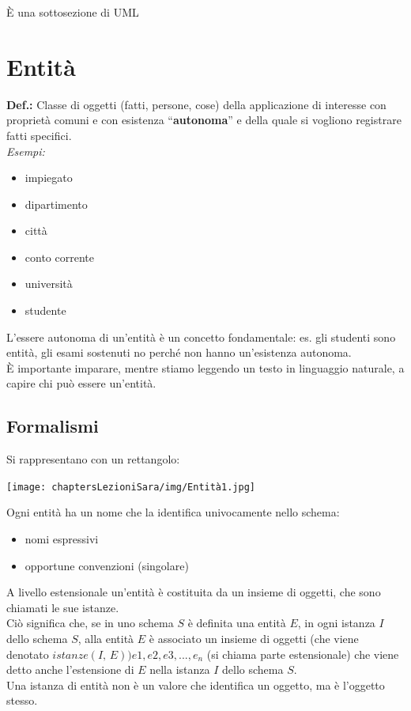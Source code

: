 \`E una sottosezione di UML

\section{Entità}
\textbf{Def.:} Classe di oggetti (fatti, persone, cose) della applicazione di interesse con proprietà comuni e con esistenza “\textbf{autonoma}” e della quale si vogliono registrare fatti specifici.
\\\textit{Esempi:}
\begin{itemize}
    \item impiegato
    \item dipartimento
    \item città
    \item conto corrente
    \item università
    \item studente
\end{itemize}
L'essere autonoma di un'entità è un concetto fondamentale: es. gli studenti sono entità, gli esami sostenuti no perché non hanno un'esistenza autonoma.
\\\`E importante imparare, mentre stiamo leggendo un testo in linguaggio naturale, a capire chi può essere un'entità.
\subsection{Formalismi}
Si rappresentano con un rettangolo:
\begin{center}
    \texttt{[image: chaptersLezioniSara/img/Entità1.jpg]}
\end{center}
Ogni entità ha un nome che la identifica univocamente nello schema:
\begin{itemize}
    \item nomi espressivi
    \item opportune convenzioni (singolare)
\end{itemize}
A livello estensionale un'entità è costituita da un insieme di oggetti, che sono chiamati le sue istanze.
\\Ciò significa che, se in uno schema $S$ è definita una entità $E$, in ogni istanza $I$ dello schema $S$, alla entità $E$ è associato un insieme di oggetti (che viene denotato $istanze(I,\, E)) {e1, e2, e3, ..., e_n}$ (si chiama parte estensionale) che viene detto anche l'estensione di $E$ nella istanza $I$ dello schema $S$.
\\Una istanza di entità non è un valore che identifica un oggetto, ma è l'oggetto stesso.

